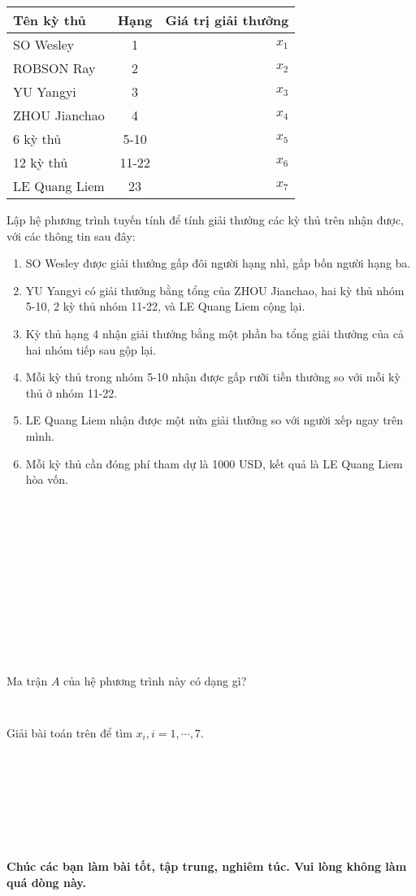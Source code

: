 \documentclass[12pt]{article}
\begin{document}
\begin{center}
\begin{tabular}{l|c|r}
Tên kỳ thủ & Hạng & Giá trị giải thưởng \\
\hline
SO Wesley & 1 & $x_1$ \\%
ROBSON Ray & 2 & $x_2$ \\%
YU Yangyi & 3 & $x_3$ \\%
ZHOU Jianchao & 4 & $x_4$ \\%
6 kỳ thủ & 5-10 & $x_5$ \\%
12 kỳ thủ & 11-22 & $x_6$ \\%
LE Quang Liem & 23 & $x_7$ \\%
\end{tabular}
\end{center}

Lập hệ phương trình tuyến tính để tính giải thưởng các kỳ thủ trên nhận được, với các thông tin sau đây:
\begin{enumerate}
 \item SO Wesley được giải thưởng gấp đôi người hạng nhì, gấp bốn người hạng ba. %
 \item YU Yangyi có giải thưởng bằng tổng của ZHOU Jianchao, hai kỳ thủ nhóm 5-10, 2 kỳ thủ nhóm 11-22, và LE Quang Liem cộng lại. %
 \item Kỳ thủ hạng 4 nhận giải thưởng bằng một phần ba tổng giải thưởng của cả hai nhóm tiếp sau gộp lại. %
 \item Mỗi kỳ thủ trong nhóm 5-10 nhận được gấp rưỡi tiền thưởng so với mỗi kỳ thủ ở nhóm 11-22. %
 \item LE Quang Liem nhận được một nửa giải thưởng so với người xếp ngay trên mình. %
 \item Mỗi kỳ thủ cần đóng phí tham dự là 1000 USD, kết quả là LE Quang Liem hòa vốn. %
\end{enumerate}


\begin{verbatim}













\end{verbatim}

Ma trận $A$ của hệ phương trình này có dạng gì?
\begin{verbatim}


\end{verbatim}

Giải bài toán trên để tìm $x_i, i=1, \cdots, 7$.
\begin{verbatim}








\end{verbatim}

\textbf{Chúc các bạn làm bài tốt, tập trung, nghiêm túc. Vui lòng không làm quá dòng này.}
\end{document}
